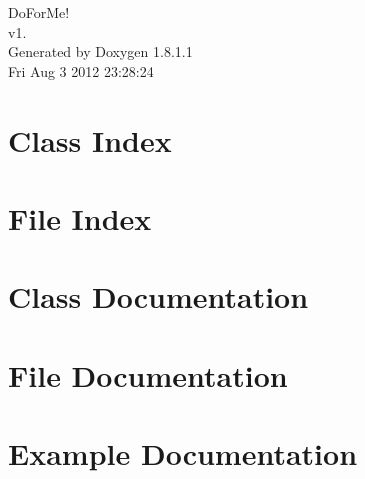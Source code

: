 \documentclass{book}
\begin{document}
\hypersetup{pageanchor=false,citecolor=blue}
\begin{titlepage}
\vspace*{7cm}
\begin{center}
{\Large Do\-For\-Me! \\[1ex]\large v1. }\\
\vspace*{1cm}
{\large Generated by Doxygen 1.8.1.1}\\
\vspace*{0.5cm}
{\small Fri Aug 3 2012 23:28:24}\\
\end{center}
\end{titlepage}
\clearemptydoublepage
{}
\tableofcontents
\clearemptydoublepage
{}
\hypersetup{pageanchor=true,citecolor=blue}
\chapter{Class Index}

\chapter{File Index}

\chapter{Class Documentation}













\chapter{File Documentation}




























\chapter{Example Documentation}

\printindex
\end{document}
